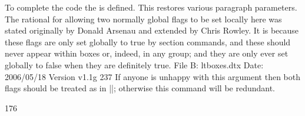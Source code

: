 \def\texprim{\texttt{\protect\TeX\ primitive}}

\begin{comment}

\def\CMhss{Glue that is infinitely stretchable as well as infinitely strechable \texprim}

\def\CMi{The \BS i command is valid in math mode and text mode. It generates an i without dot (Unicode U+131, \i). The \BS I command expands to I, but is converted to \BS i by \BS MakeLowercase. \texprim}


\ccommand{\CMi}

\reflect{\CMhss}

\reflect{\CMi}

\CMi

\if{\meaning\par}{\meaning\par}{True} \else {false}

\ifx{\par\meaning}{\meaning\par}{True}\else{false}


\end{comment}


To complete the code the \cmd{\@arrayparboxrestore} is defined. This  restores various paragraph parameters. The rational for allowing two normally global 
flags to be set locally here was stated originally by Donald Arsenau and extended by Chris Rowley. It is because these  flags are only set globally to true by section commands, and these should
never appear within boxes or, indeed, in any group; and they are only ever set globally to false when they are definitely true.
File B: ltboxes.dtx Date: 2006/05/18 Version v1.1g 237
If anyone is unhappy with this argument then both 
flags should be treated as in |\set@nobreak|; otherwise this command will be redundant.

\begin{teXX}
176 \def\@arrayparboxrestore{%
177 \let\if@nobreak\iffalse
178 \let\if@noskipsec\iffalse
179 \let\par\@@par
180 \let\-\@dischyph
\end{teXX}

Redefined accents to allow changes in font encoding
\begin{teXX}
181 \let\'\@acci\let\`\@accii\let\=\@acciii
182 \parindent\z@ \parskip\z@skip
183 \everypar{}%
184 \linewidth\hsize
185 \@totalleftmargin\z@
186 \leftskip\z@skip \rightskip\z@skip \@rightskip\z@skip
187 \parfillskip\@flushglue \lineskip\normallineskip
188 \baselineskip\normalbaselineskip
189 \sloppy}
\end{teXX}

